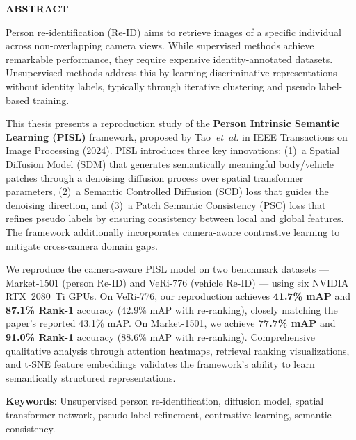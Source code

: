 \thispagestyle{plain}
\begin{center}
    \Large \textbf{\uppercase{Abstract}}
\end{center}

\vspace{3\baselineskip}

\noindent
Person re-identification (Re-ID) aims to retrieve images of a specific individual across non-overlapping camera views. While supervised methods achieve remarkable performance, they require expensive identity-annotated datasets. Unsupervised methods address this by learning discriminative representations without identity labels, typically through iterative clustering and pseudo label-based training.

This thesis presents a reproduction study of the \textbf{Person Intrinsic Semantic Learning (PISL)} framework, proposed by Tao~\textit{et~al.} in IEEE Transactions on Image Processing (2024). PISL introduces three key innovations: (1)~a Spatial Diffusion Model (SDM) that generates semantically meaningful body/vehicle patches through a denoising diffusion process over spatial transformer parameters, (2)~a Semantic Controlled Diffusion (SCD) loss that guides the denoising direction, and (3)~a Patch Semantic Consistency (PSC) loss that refines pseudo labels by ensuring consistency between local and global features. The framework additionally incorporates camera-aware contrastive learning to mitigate cross-camera domain gaps.

We reproduce the camera-aware PISL model on two benchmark datasets --- Market-1501 (person Re-ID) and VeRi-776 (vehicle Re-ID) --- using six NVIDIA RTX~2080~Ti GPUs. On VeRi-776, our reproduction achieves \textbf{41.7\% mAP} and \textbf{87.1\% Rank-1} accuracy (42.9\% mAP with re-ranking), closely matching the paper's reported 43.1\% mAP. On Market-1501, we achieve \textbf{77.7\% mAP} and \textbf{91.0\% Rank-1} accuracy (88.6\% mAP with re-ranking). Comprehensive qualitative analysis through attention heatmaps, retrieval ranking visualizations, and t-SNE feature embeddings validates the framework's ability to learn semantically structured representations.

\vspace{\baselineskip}

\noindent
\textbf{Keywords}: Unsupervised person re-identification, diffusion model, spatial transformer network, pseudo label refinement, contrastive learning, semantic consistency.
